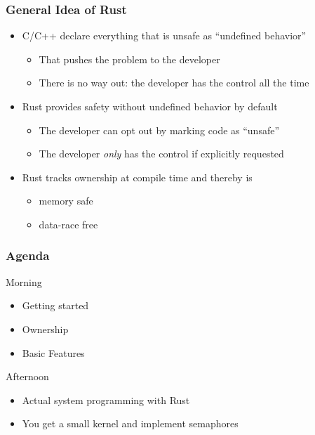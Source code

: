 \begin{frame}
    \frametitle{General Idea of Rust}

    \begin{itemize}
        \item C/C++ declare everything that is unsafe as ``undefined behavior''
        \begin{itemize}
            \item That pushes the problem to the developer
            \item There is no way out: the developer has the control all the time
        \end{itemize}

        \pause

        \item Rust provides safety without undefined behavior by default
        \begin{itemize}
            \item The developer can opt out by marking code as ``unsafe''
            \item The developer \emph{only} has the control if explicitly requested
        \end{itemize}

        \pause

        \item Rust tracks ownership at compile time and thereby is
        \begin{itemize}
            \item memory safe
            \item data-race free
        \end{itemize}
    \end{itemize}
\end{frame}

\begin{frame}
    \frametitle{Agenda}

    \begin{block}{Morning}
    \begin{itemize}
        \item Getting started
        \item Ownership
        \item Basic Features
    \end{itemize}
    \end{block}

    \pause

    \begin{block}{Afternoon}
    \begin{itemize}
        \item Actual system programming with Rust
        \item You get a small kernel and implement semaphores
    \end{itemize}
    \end{block}
\end{frame}
